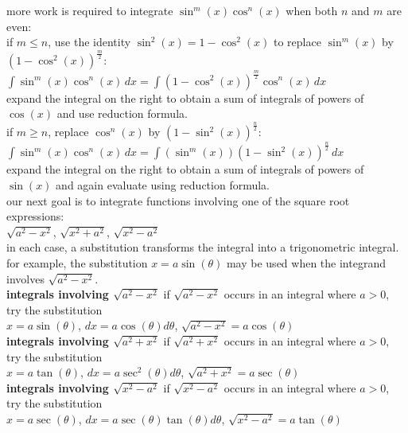 \documentclass{article}
\begin{document}
more work is required to integrate $\sin^m(x)\cos^n(x)$ when both $n$ and $m$ are even:\\ if $m \leq n$, use the identity $\sin^2(x) = 1 - \cos^2(x)$ to replace $\sin^m(x)$ by $(1 - \cos^2(x))^{\frac{m}{2}}$:\\ $\int\sin^m(x)\cos^n(x)\,dx = \int(1 - \cos^2(x))^{\frac{m}{2}}\cos^n(x)\,dx$\\ expand the integral on the right to obtain a sum of integrals of powers of $\cos(x)$ and use reduction formula.\\ if $m \geq n$, replace $\cos^n(x)$ by $(1 - \sin^2(x))^{\frac{n}{2}}$:\\ $\int\sin^m(x)\cos^n(x)\,dx = \int(\sin^m(x))(1 - \sin^2(x))^{\frac{n}{2}}\,dx$\\ expand the integral on the right to obtain a sum of integrals of powers of $\sin(x)$ and again evaluate using reduction formula.\\

our next goal is to integrate functions involving one of the square root expressions:\\ $\sqrt{a^2 - x^2}$, $\sqrt{x^2 + a^2}$, $\sqrt{x^2 - a^2}$\\ in each case, a substitution transforms the integral into a trigonometric integral. for example, the substitution $x = a\sin(\theta)$ may be used when the integrand involves $\sqrt{a^2 - x^2}$.\\

\textbf{integrals involving $\sqrt{a^2 - x^2}$} if $\sqrt{a^2 - x^2}$ occurs in an integral where $a > 0$, try the substitution\\
$x = a\sin(\theta)$, $dx = a\cos(\theta)d\theta$, $\sqrt{a^2 - x^2} = a\cos(\theta)$\\

\textbf{integrals involving $\sqrt{a^2 + x^2}$} if $\sqrt{a^2 + x^2}$ occurs in an integral where $a > 0$, try the substitution\\
$x = a\tan(\theta)$, $dx = a\sec^2(\theta)d\theta$, $\sqrt{a^2 + x^2} = a\sec(\theta)$\\

\textbf{integrals involving $\sqrt{x^2 - a^2}$} if $\sqrt{x^2 - a^2}$ occurs in an integral where $a > 0$, try the substitution\\
$x = a\sec(\theta)$, $dx = a\sec(\theta)\tan(\theta)d\theta$, $\sqrt{x^2 - a^2} = a\tan(\theta)$\\
\end{document}

